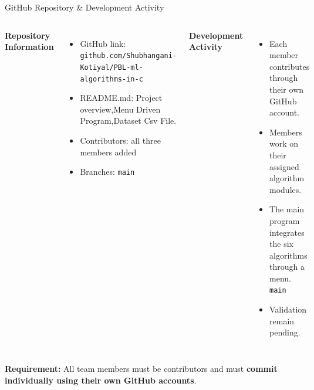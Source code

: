 \documentclass[aspectratio=169,11pt]{beamer}
\begin{document}
\begin{frame}[shrink=15]{GitHub Repository \& Development Activity}

\begin{columns}[T,totalwidth=\textwidth]
\textbf{\color{GEUBlue}Repository Information}
\begin{itemize}\itemsep2pt
\footnotesize
\item GitHub link: {\scriptsize\texttt{github.com/Shubhangani-Kotiyal/PBL-ml-algorithms-in-c}}
\item README.md: Project overview,Menu Driven Program,Dataset Csv File.
\item Contributors: all three members added
\item Branches: \texttt{main}
\end{itemize}

\textbf{\color{GEUBlue}Development Activity}
\begin{itemize}\itemsep2pt
\footnotesize
\item Each member contributes through their own GitHub account.
\item Members work on their assigned algorithm modules.
\item The main program integrates the six algorithms through a menu. \texttt{main}
\item Validation remain pending.
\end{itemize}
\end{columns}

\vspace{1mm}
\begin{center}
\colorbox{GEULightBlue}{\parbox{.88\textwidth}{\centering
\textbf{Requirement:} All team members must be contributors and must
\textbf{commit individually using their own GitHub accounts}.}}
\end{center}
\end{frame}
\end{document}

